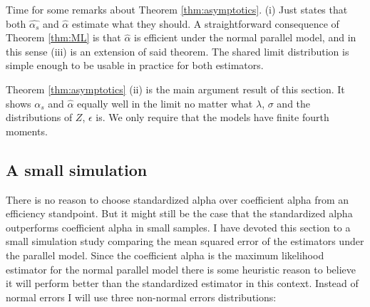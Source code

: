 \documentclass{article}
\theoremstyle{plain}
\theoremstyle{plain}
\theoremstyle{definition}
\theoremstyle{remark}
\theoremstyle{definition}
\theoremstyle{plain}
\theoremstyle{plain}
\theoremstyle{definition}
\begin{document}
Time for some remarks about Theorem \ref{thm:asymptotics}. (i) Just states that both $\widehat{\alpha_s}$ and $\widehat{\alpha}$ estimate what they should. A straightforward consequence of Theorem \ref{thm:ML} is that $\widehat{\alpha}$ is efficient under the normal parallel model, and in this sense (iii) is an extension of said theorem. The shared limit distribution is simple enough to be usable in practice for both estimators. 

Theorem \ref{thm:asymptotics} (ii) is the main argument result of this section. It shows $\alpha_{s}$ and $\widehat{\alpha}$ equally well in the limit no matter what $\lambda$, $\sigma$ and the distributions of $Z$, $\epsilon$ is. We only require that the models have finite fourth moments.

\subsection{A small simulation}
There is no reason to choose standardized alpha over coefficient alpha from an efficiency standpoint. But it might still be the case
that the standardized alpha outperforms coefficient alpha
in small samples. I have devoted this section to a small simulation
study comparing the mean squared error of the estimators under
the parallel model. Since the coefficient alpha is the maximum likelihood
estimator for the normal parallel model there is some heuristic reason
to believe it will perform better than the standardized estimator
in this context. Instead of normal errors I will use three non-normal
errors distributions:
\end{document}

